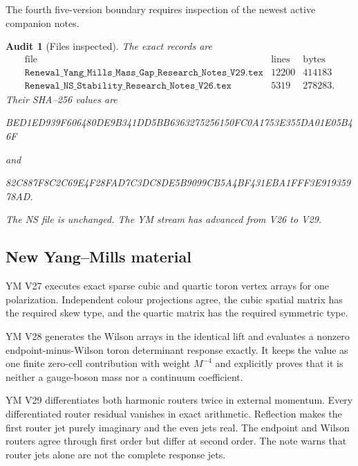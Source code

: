 \documentclass[11pt]{article}
\newtheorem{audit}[theorem]{Audit}
\begin{document}
The fourth five-version boundary requires inspection of the newest active
companion notes.

\begin{audit}[Files inspected]
\label{audit:v11v20-files}
The exact records are
\[
\begin{array}{c|r|r}
\text{file}&\text{lines}&\text{bytes}\\ \hline
\texttt{Renewal\_Yang\_Mills\_Mass\_Gap\_Research\_Notes\_V29.tex}
&12200&414183\\
\texttt{Renewal\_NS\_Stability\_Research\_Notes\_V26.tex}
&5319&278283.
\end{array}
\]
Their SHA--256 values are
\begin{center}
\small\ttfamily
BED1ED939F606480DE9B341DD5BB6363275256150FC0A1753E355DA01E05B46F
\end{center}
and
\begin{center}
\small\ttfamily
82C887F8C2C69E4F28FAD7C3DC8DE5B9099CB5A4BF431EBA1FFF3E91935978AD.
\end{center}
The NS file is unchanged.  The YM stream has advanced from V26 to V29.
\end{audit}

\subsection{New Yang--Mills material}

YM V27 executes exact sparse cubic and quartic toron vertex arrays for one
polarization.  Independent colour projections agree, the cubic spatial
matrix has the required skew type, and the quartic matrix has the required
symmetric type.

YM V28 generates the Wilson arrays in the identical lift and evaluates a
nonzero endpoint-minus-Wilson toron determinant response exactly.  It
keeps the value as one finite zero-cell contribution with weight
\(M^{-4}\) and explicitly proves that it is neither a gauge-boson mass nor
a continuum coefficient.

YM V29 differentiates both harmonic routers twice in external momentum.
Every differentiated router residual vanishes in exact arithmetic.
Reflection makes the first router jet purely imaginary and the even jets
real.  The endpoint and Wilson routers agree through first order but
differ at second order.  The note warns that router jets alone are not the
complete response jets.
\end{document}
